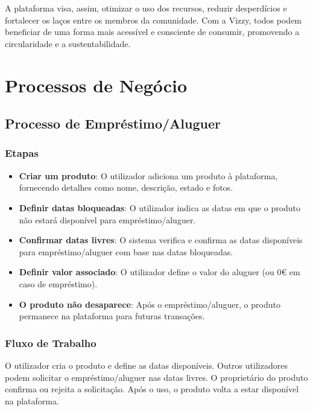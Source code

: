 \documentclass[a4paper, 12pt]{article} %
\begin{document}
A plataforma visa, assim, otimizar o uso dos recursos, reduzir desperdícios e fortalecer os laços entre os membros da comunidade. Com a Vizzy, todos podem beneficiar de uma forma mais acessível e consciente de consumir, promovendo a circularidade e a sustentabilidade.


\newpage
\section{Processos de Negócio}

\subsection{Processo de Empréstimo/Aluguer}

\subsubsection{Etapas}
\begin{itemize}
	\item \textbf{Criar um produto}: O utilizador adiciona um produto à plataforma, fornecendo detalhes como nome, descrição, estado e fotos.
	\item \textbf{Definir datas bloqueadas}: O utilizador indica as datas em que o produto não estará disponível para empréstimo/aluguer.
	\item \textbf{Confirmar datas livres}: O sistema verifica e confirma as datas disponíveis para empréstimo/aluguer com base nas datas bloqueadas.
	\item \textbf{Definir valor associado}: O utilizador define o valor do aluguer (ou 0€ em caso de empréstimo).
	\item \textbf{O produto não desaparece}: Após o empréstimo/aluguer, o produto permanece na plataforma para futuras transações.
\end{itemize}

\subsubsection{Fluxo de Trabalho}
O utilizador cria o produto e define as datas disponíveis. Outros utilizadores podem solicitar o empréstimo/aluguer nas datas livres. O proprietário do produto confirma ou rejeita a solicitação. Após o uso, o produto volta a estar disponível na plataforma.
\end{document}

